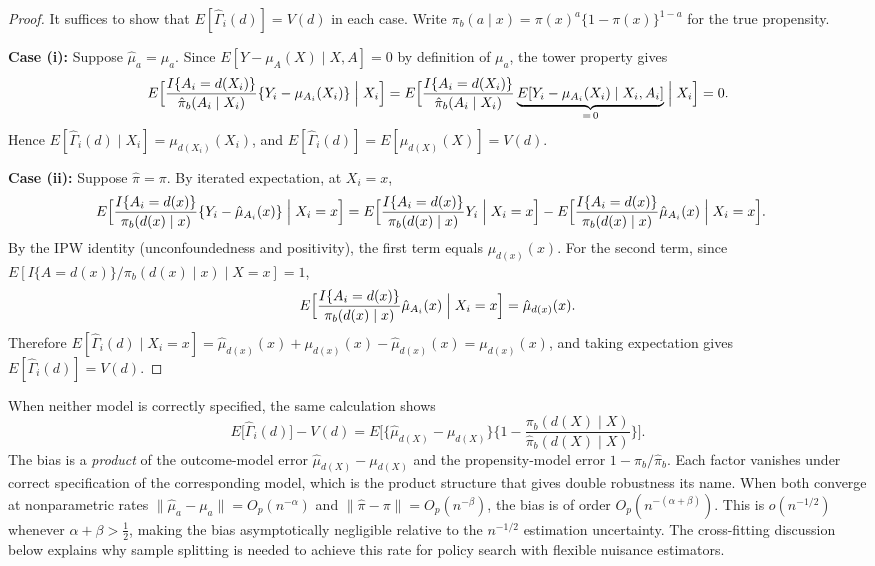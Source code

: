 \documentclass[master.tex]{subfiles}
\begin{document}
\begin{proof}
It suffices to show that \(E[\hat\Gamma_i(d)]=V(d)\) in each case. Write
\(\pi_b(a\mid x)=\pi(x)^a\{1-\pi(x)\}^{1-a}\) for the true propensity.

\textbf{Case (i):} Suppose \(\hat\mu_a=\mu_a\). Since \(E[Y-\mu_{A}(X)\mid X,A]=0\) by definition of \(\mu_a\), the tower property gives
\[
E\Bigl[
  \frac{I\{A_i=d(X_i)\}}{\hat\pi_b(A_i\mid X_i)}
  \{Y_i-\mu_{A_i}(X_i)\}
\Bigm| X_i\Bigr]
= E\Bigl[
    \frac{I\{A_i=d(X_i)\}}{\hat\pi_b(A_i\mid X_i)}
    \underbrace{E[Y_i-\mu_{A_i}(X_i)\mid X_i,A_i]}_{=\,0}
  \Bigm| X_i\Bigr] = 0.
\]
Hence \(E[\hat\Gamma_i(d)\mid X_i]=\mu_{d(X_i)}(X_i)\), and \(E[\hat\Gamma_i(d)]=E[\mu_{d(X)}(X)]=V(d)\).

\textbf{Case (ii):} Suppose \(\hat\pi=\pi\). By iterated expectation, at \(X_i=x\),
\begin{align*}
E\Bigl[
  \frac{I\{A_i=d(x)\}}{\pi_b(d(x)\mid x)}
  \{Y_i-\hat\mu_{A_i}(x)\}
\Bigm| X_i=x\Bigr]
&= E\Bigl[
     \frac{I\{A_i=d(x)\}}{\pi_b(d(x)\mid x)}Y_i
   \Bigm| X_i=x\Bigr]
   - E\Bigl[
     \frac{I\{A_i=d(x)\}}{\pi_b(d(x)\mid x)}\hat\mu_{A_i}(x)
   \Bigm| X_i=x\Bigr].
\end{align*}
By the IPW identity (unconfoundedness and positivity), the first term equals
\(\mu_{d(x)}(x)\). For the second term, since
\(E[I\{A=d(x)\}/\pi_b(d(x)\mid x)\mid X=x]=1\),
\[
E\Bigl[
  \frac{I\{A_i=d(x)\}}{\pi_b(d(x)\mid x)}\hat\mu_{A_i}(x)
\Bigm| X_i=x\Bigr]
= \hat\mu_{d(x)}(x).
\]
Therefore
\(E[\hat\Gamma_i(d)\mid X_i=x]
 =\hat\mu_{d(x)}(x)+\mu_{d(x)}(x)-\hat\mu_{d(x)}(x)=\mu_{d(x)}(x)\),
and taking expectation gives \(E[\hat\Gamma_i(d)]=V(d)\).
\end{proof}

\begin{remark}
\label{w14:rem:dr-bias}
When neither model is correctly specified, the same calculation shows
\[
E\bigl[\hat\Gamma_i(d)\bigr] - V(d)
= E\biggl[
    \bigl\{\hat\mu_{d(X)}-\mu_{d(X)}\bigr\}
    \biggl\{1-\frac{\pi_b(d(X)\mid X)}{\hat\pi_b(d(X)\mid X)}\biggr\}
  \biggr].
\]
The bias is a \emph{product} of the outcome-model error
\(\hat\mu_{d(X)}-\mu_{d(X)}\) and the propensity-model error
\(1-\pi_b/\hat\pi_b\). Each factor vanishes under correct specification of
the corresponding model, which is the product structure that gives double
robustness its name. When both converge at nonparametric rates
\(\|\hat\mu_a-\mu_a\|=O_p(n^{-\alpha})\) and
\(\|\hat\pi-\pi\|=O_p(n^{-\beta})\), the bias is of order
\(O_p(n^{-(\alpha+\beta)})\). This is \(o(n^{-1/2})\) whenever
\(\alpha+\beta>\tfrac{1}{2}\), making the bias asymptotically negligible
relative to the \(n^{-1/2}\) estimation uncertainty. The cross-fitting
discussion below explains why sample splitting is needed to achieve this
rate for policy search with flexible nuisance estimators.
\end{remark}
\end{document}
